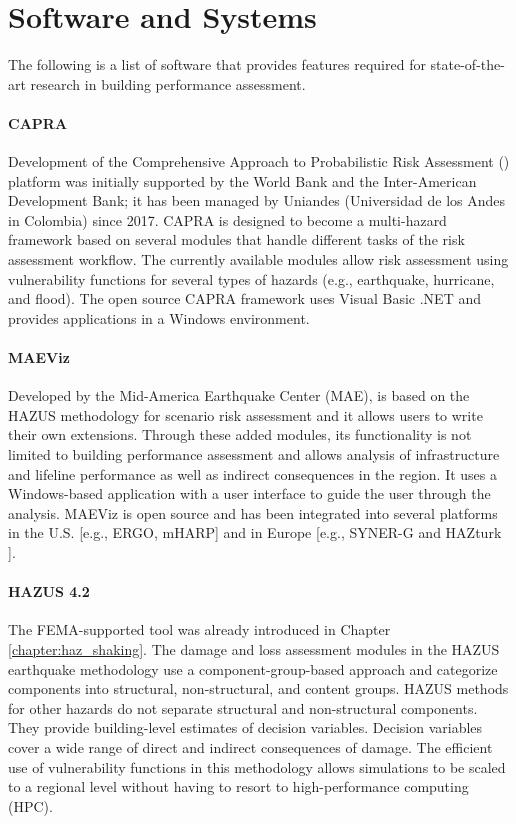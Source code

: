\section{Software and Systems}
\label{sec:perf_bldg_tools}

The following is a list of software that provides features required for state-of-the-art research in building performance assessment.

\paragraph{CAPRA} Development of the Comprehensive Approach to Probabilistic Risk Assessment () platform was initially supported by the World Bank and the Inter-American Development Bank; it has been managed by Uniandes (Universidad de los Andes in Colombia) since 2017. CAPRA is designed to become a multi-hazard framework based on several modules that handle different tasks of the risk assessment workflow. The currently available modules allow risk assessment using vulnerability functions for several types of hazards (e.g., earthquake, hurricane, and flood). The open source CAPRA framework uses Visual Basic .NET and provides applications in a Windows environment.

\paragraph{MAEViz} 
Developed by the Mid-America Earthquake Center (MAE),  is based on the HAZUS methodology for scenario risk assessment and it allows users to write their own extensions. Through these added modules, its functionality is not limited to building performance assessment and allows analysis of infrastructure and lifeline performance as well as indirect consequences in the region. It uses a Windows-based application with a user interface to guide the user through the analysis. MAEViz is open source and has been integrated into several platforms in the U.S. [e.g., ERGO, mHARP] and in Europe [e.g., SYNER-G \citep{pitilakis2014synerg} and HAZturk \citep{karaman2008earthquake}].

\paragraph{HAZUS 4.2} The FEMA-supported  tool was already introduced in Chapter \ref{chapter:haz_shaking}. The damage and loss assessment modules in the HAZUS earthquake methodology use a component-group-based approach and categorize components into structural, non-structural, and content groups. HAZUS methods for other hazards do not separate structural and non-structural components. They provide building-level estimates of decision variables. Decision variables cover a wide range of direct and indirect consequences of damage. The efficient use of vulnerability functions in this methodology allows simulations to be scaled to a regional level without having to resort to high-performance computing  (HPC).

